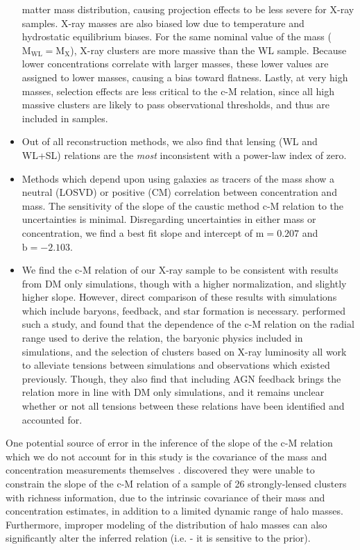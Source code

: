 \begin{itemize}
  matter mass distribution, causing projection effects to 
  be less severe for X-ray samples. X-ray masses are also biased low due to
  temperature and hydrostatic equilibrium biases. For the same nominal value of
  the mass ($\mathrm{M_{WL} = M_{X}}$), X-ray clusters are more massive
  than the WL sample. Because lower concentrations correlate with larger
  masses, these lower values are assigned to lower masses, causing a bias
  toward flatness. Lastly, at very high masses, selection effects are less
  critical to the c-M relation, since all high massive clusters are likely
  to pass observational thresholds, and thus are included in samples.
\item Out of all reconstruction methods, we also find that lensing (WL and
  WL+SL) relations are the {\em most} inconsistent with a power-law index of zero.
\item Methods which depend upon using galaxies as tracers of the mass
  show a neutral (LOSVD) or positive (CM) correlation between concentration and
  mass. The sensitivity of the slope of the caustic method c-M relation to the
  uncertainties is minimal. Disregarding uncertainties in either mass or
  concentration, we find a best fit slope and intercept of $\mathrm{m=0.207}$
  and $\mathrm{b=-2.103}$.
\item We find the c-M relation of our X-ray sample to be consistent with
  results from DM only simulations, though with a higher
  normalization, and slightly higher slope. However, direct comparison of these
  results with simulations  which include baryons, feedback, and star formation is
  necessary. \citet{RA13.1} performed such a study, and found that the
  dependence of the c-M relation on the radial range used to derive the
  relation, the baryonic physics included in simulations, and the selection of
  clusters based on X-ray luminosity all work to alleviate tensions between
  simulations and observations which existed previously. Though, they also find that
  including AGN feedback brings the relation more in line with DM only
  simulations, and it remains unclear whether or not all tensions between these
  relations have been identified and accounted for.
\end{itemize}


One potential source of error in the inference of the slope of the
c-M relation which we do not account for in this study is the covariance of the
mass and concentration measurements themselves \citep{SE15.2}. \citet{AU13.1}
discovered they were unable to constrain the slope of the c-M relation of a
sample of 26 strongly-lensed clusters with richness information, due to the
intrinsic covariance of their mass and concentration estimates, in addition to
a limited dynamic range of halo masses. Furthermore, improper modeling of the
distribution of halo masses can also significantly alter the inferred
relation (i.e. - it is sensitive to the prior). 

